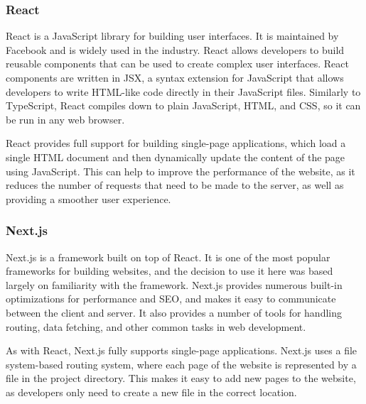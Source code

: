 \documentclass[../main.tex]{subfiles}
\begin{document}
            \subsubsection{React}
                React is a JavaScript library for building user interfaces.
                It is maintained by Facebook and is widely used in the industry.
                React allows developers to build reusable components that can be used to create
                    complex user interfaces.
                React components are written in JSX, a syntax extension for JavaScript that
                    allows developers to write HTML-like code directly in their JavaScript files.
                Similarly to TypeScript, React compiles down to plain JavaScript, HTML, and
                    CSS, so it can be run in any web browser.

                React provides full support for building single-page applications, which load a
                    single HTML document and then dynamically update the content of the page using
                    JavaScript.
                This can help to improve the performance of the website, as it reduces the
                    number of requests that need to be made to the server, as well as providing a
                    smoother user experience.

            \subsubsection{Next.js}
                Next.js is a framework built on top of React.
                It is one of the most popular frameworks for building websites, and the
                    decision to use it here was based largely on familiarity with the framework.
                Next.js provides numerous built-in optimizations for performance and SEO, and
                    makes it easy to communicate between the client and server.
                It also provides a number of tools for handling routing, data fetching, and
                    other common tasks in web development.

                As with React, Next.js fully supports single-page applications.
                Next.js uses a file system-based routing system, where each page of the website
                    is represented by a file in the project directory.
                This makes it easy to add new pages to the website, as developers only need to
                    create a new file in the correct location.
\end{document}

